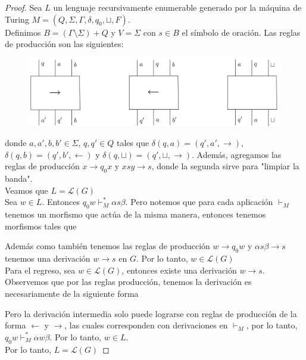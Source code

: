 \documentclass[../main.tex]{subfiles}
\begin{document}
\begin{proof}
	Sea $L$ un lenguaje recursivamente enumerable generado por la máquina de Turing $M=(Q, \Sigma, \Gamma, \delta, q_0, \sqcup, F)$. \\
	Definimos $B=(\Gamma \setminus \Sigma ) + Q$ y $V= \Sigma$ con $s \in B$ el símbolo de oración. Las reglas de producción son las siguientes: 
	\begin{figure}[H]
		\includegraphics[scale=6.5]{diagrama/turing.png}
		\centering
	\end{figure}
	donde $a,a',b,b' \in \Sigma$, $q,q' \in Q$ tales que $\delta (q, a)=(q',a',\rightarrow)$, $\delta (q, b)=(q',b',\leftarrow)$ y $\delta (q, \sqcup)=(q',\sqcup,\rightarrow)$. Además, agregamos las reglas de producción $x \to q_0 x$ y $xsy \to s$, donde la segunda sirve para "limpiar la banda". \\
	Veamos que $L=\mathcal{L}(G)$ \\
	Sea $w \in L$. Entonces $q_0w \vdash_M^* \alpha s \beta$. Pero notemos que para cada aplicación $\vdash_M$ tenemos un morfismo que actúa de la misma manera, entonces tenemos morfismos tales que
	\begin{center}
	\end{center}
	Además como también tenemos las reglas de producción $w \to q_0w$ y $\alpha s \beta \to s$ tenemos una derivación $w \to s$ en $G$. Por lo tanto, $w \in \mathcal{L}(G)$ \\
	Para el regreso, sea $w \in \mathcal{L}(G)$, entonces existe una derivación $w \to s$. \\
	Observemos que por las reglas producción, tenemos la derivación es necesariamente de la siguiente forma
		\begin{center}
		\end{center}
	Pero la derivación intermedia solo puede lograrse con reglas de producción de la forma $\leftarrow$ y $\rightarrow$, las cuales corresponden con derivaciones en $\vdash_M$, por lo tanto, $q_0 w \vdash_M^* \alpha w \beta$. Por lo tanto, $w \in L$.\\
	Por lo tanto, $L=\mathcal{L}(G)$
\end{proof}
\end{document}
